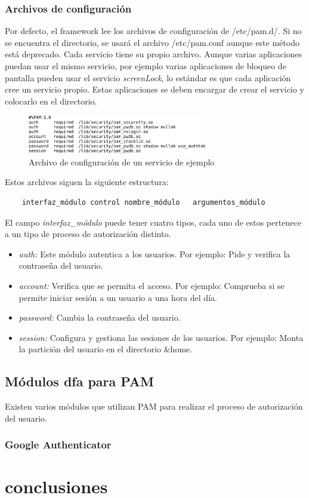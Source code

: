 \documentclass[titlepage, 12pt, a4paper]{article}
\begin{document}
\subsubsection{Archivos de configuración}
Por defecto, el framework lee los archivos de configuración de /etc/pam.d/. Si no se encuentra el directorio, se usará el archivo /etc/pam.conf aunque este método está deprecado. Cada servicio tiene su propio archivo. Aunque varias aplicaciones puedan usar el mismo servicio, por ejemplo varias aplicaciones de bloqueo de pantalla pueden usar el servicio \textit{screenLock}, lo estándar es que cada aplicación cree un servicio propio. Estas aplicaciones se deben encargar de crear el servicio y colocarlo en el directorio.
\begin{figure}[H]
    \centering
    \includegraphics[width=0.7\textwidth]{Media/PAMConfigFile.png}
    \caption{Archivo de configuración de un servicio de ejemplo}
    \label{fig:archivoServicio}
\end{figure}
Estos archivos siguen la siguiente estructura:
\begin{verbatim}
	interfaz_módulo	control	nombre_módulo	argumentos_módulo
\end{verbatim}
El campo \textit{interfaz\_módulo} puede tener cuatro tipos, cada uno de estos pertenece a un tipo de proceso de autorización distinto.
\begin{itemize}
	\item{\textit{auth: }}Este módulo autentica a los usuarios. Por ejemplo: Pide y verifica la contraseña del usuario.
	\item{\textit{account: }}Verifica que se permita el acceso. Por ejemplo: Comprueba si se permite iniciar sesión a un usuario a una hora del día.
	\item{\textit{password: }}Cambia la contraseña del usuario.
	\item{\textit{session: }}Configura y gestiona las sesiones de los usuarios. Por ejemplo: Monta la partición del usuario en el directorio \&home.
\end{itemize}
\subsection{Módulos \Gls{dfa} para PAM}
Existen varios módulos que utilizan PAM para realizar el proceso de autorización del usuario.
\subsubsection{Google Authenticator}

\section{conclusiones}
\clearpage
\printbibliography[heading=bibintoc,title={Bibliografía}]
\end{document}
